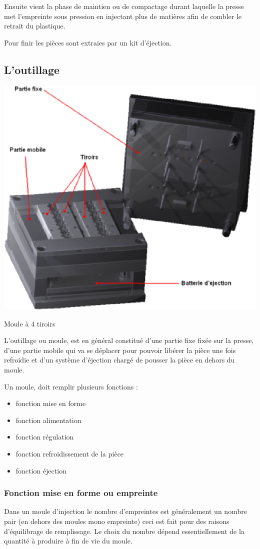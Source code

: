 \documentclass[11pt,oneside]{article}
\begin{document}
Ensuite vient la phase de maintien ou de compactage durant laquelle la
presse met l'empreinte sous pression en injectant plus de matières afin
de combler le retrait du plastique. 

Pour finir les pièces sont extraies par un kit d'éjection. 

        \subsection{L'outillage}

     
\begin{multicols}{2}
 
\begin{center}
 \includegraphics[width=.35\textwidth]{png/moule_inject}

Moule à 4 tiroirs 
\end{center}


    L'outillage ou moule, est en général constitué d'une partie fixe fixée sur
la presse, d'une  partie  mobile  qui  va  se  déplacer  pour  pouvoir  libérer 
la  pièce  une fois  refroidie  et  d'un 
système d'éjection chargé de pousser la pièce en dehors du moule. 

Un  moule,  doit remplir  plusieurs fonctions : 
\begin{itemize}
 \item fonction mise en forme 
\item fonction alimentation 
\item fonction régulation 
\item fonction refroidissement de la pièce 
\item fonction éjection 
\end{itemize}
\end{multicols} 
 
           
        \subsubsection{Fonction mise en forme ou empreinte}
        Dans un moule d'injection le nombre d'empreintes est généralement un
nombre pair 
(en  dehors  des  moules  mono  empreinte)  ceci  est  fait  pour  des  raisons 
d'équilibrage  de 
remplissage. 
        Le choix du nombre dépend essentiellement de la quantité à produire à
fin de vie du 
moule. 
        
\end{document}
